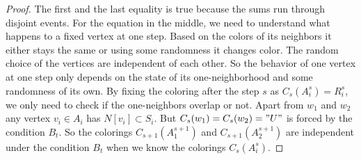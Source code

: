 \documentclass[10pt,a4paper]{amsart}
\begin{document}
\begin{proof}
The first and the last equality is true because the sums run through disjoint events. For the equation in the middle, we need to understand what happens to a fixed vertex at one step. Based on the colors of its neighbors it either stays the same or using some randomness it changes color. The random choice of the vertices are independent of each other. So the behavior of one vertex at one step only depends on the state of its one-neighborhood and some randomness of its own. By fixing the coloring after the step $s$ as $C_s(A_i^s)=R_i^s$, we only need to check if the one-neighbors overlap or not. Apart from $w_1$ and $w_2$ any vertex $v_i\in A_i$ has $N[v_i]\subset S_i$. But $C_{s}(w_1)=C_{s}(w_2)="U"$ is forced by the condition $B_t$. So the colorings $C_{s+1}(A_1^{s+1})$ and $C_{s+1}(A_2^{s+1})$ are independent under the condition $B_t$ when we know the colorings $C_s(A_i^s)$.
\end{proof}
\end{document}
